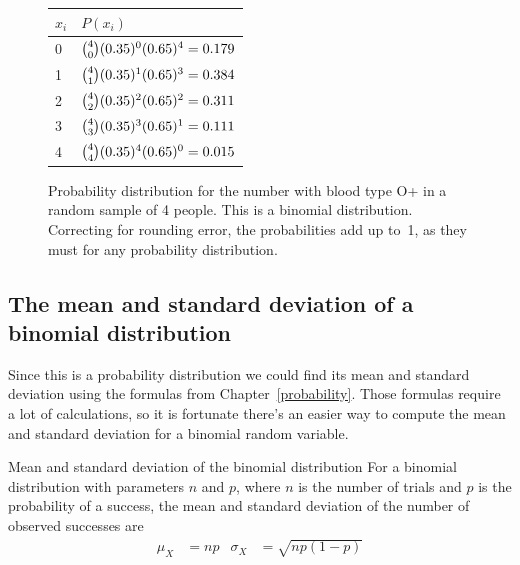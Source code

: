 \begin{figure}[h]
\begin{minipage}[c]{0.37\textwidth}\centering%
\begin{tabular}{l l}
$x_i$ & $P(x_i)$ \\
\hline
0 &  ${4\choose 0}(0.35{})^0(0.65{})^{4} = 0.179$ \vspace{1mm}\\
1 &  ${4\choose 1}(0.35{})^1(0.65{})^{3} = 0.384$  \vspace{1mm}\\
2 & ${4\choose 2}(0.35{})^2(0.65{})^{2} = 0.311$  \vspace{1mm}\\
3 & ${4\choose 3}(0.35{})^3(0.65{})^{1} = 0.111$  \vspace{1mm}\\
4 & ${4\choose 4}(0.35{})^4(0.65{})^{0} = 0.015$  \vspace{1mm}\\
\hline
\end{tabular}
\end{minipage}
\begin{minipage}[c]{0.6\textwidth}\centering%
\end{minipage}
\caption{Probability distribution for the number with blood type O+ in a random sample of 4 people. This is a binomial distribution. Correcting for rounding error, the probabilities add up to~1, as they must for any probability distribution.}
\label{oPositive4}
\label{binomDistrOPositive}
\end{figure}



\D{\newpage}

\subsection{The mean and standard deviation of a binomial distribution}

Since this is a probability distribution we could find its mean and
standard deviation using the formulas from Chapter~\ref{probability}.
Those formulas require a lot of calculations, so it is fortunate there's
an easier way to compute the mean and standard deviation for a binomial
random variable.

\begin{onebox}{Mean and standard deviation of the binomial distribution}
For a binomial distribution with parameters $n$ and $p$, where $n$ is the number of trials and $p$ is the probability of a success, the mean and standard deviation of the number of observed successes are\vspace{-2mm}
\begin{align*}
\mu_{\scriptscriptstyle{X}} &= np
	&\sigma_{\scriptscriptstyle{X}} &= \sqrt{np(1-p)}
\end{align*}
\end{onebox}

